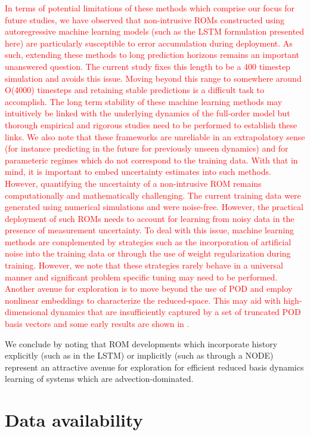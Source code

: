 \documentclass[preprint,12pt]{elsarticle}
\begin{document}
\textcolor{red}{In terms of potential limitations of these methods which comprise our focus for future studies, we have observed that non-intrusive ROMs constructed using autoregressive machine learning models (such as the LSTM formulation presented here) are particularly susceptible to error accumulation during deployment. As such, extending these methods to long prediction horizons remains an important unanswered question. The current study fixes this length to be a 400 timestep simulation and avoids this issue. Moving beyond this range to somewhere around O(4000) timesteps and retaining stable predictions is a difficult task to accomplish. The long term stability of these machine learning methods may intuitively be linked with the underlying dynamics of the full-order model but thorough empirical and rigorous studies need to be performed to establish these links. We also note that these frameworks are unreliable in an extrapolatory sense (for instance predicting in the future for previously unseen dynamics) and for parameteric regimes which do not correspond to the training data. With that in mind, it is important to embed uncertainty estimates into such methods. However, quantifying the uncertainty of a non-intrusive ROM remains computationally and mathematically challenging. The current training data were generated using numerical simulations and were noise-free. However, the practical deployment of such ROMs needs to account for learning from noisy data in the presence of measurement uncertainty. To deal with this issue, machine learning methods are complemented by strategies such as the incorporation of artificial noise into the training data or through the use of weight regularization during training. However, we note that these strategies rarely behave in a universal manner and significant problem specific tuning may need to be performed. Another avenue for exploration is to move beyond the use of POD and employ nonlinear embeddings to characterize the reduced-space. This may aid with high-dimensional dynamics that are insufficiently captured by a set of truncated POD basis vectors and some early results are shown in \cite{lee2019model}.}

We conclude by noting that ROM developments which incorporate history explicitly (such as in the LSTM) or implicitly (such as through a NODE) represent an attractive avenue for exploration for efficient reduced basis dynamics learning of systems which are advection-dominated.

\section{Data availability}
\end{document}
